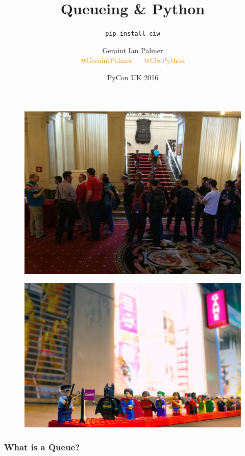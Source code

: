 \documentclass{beamer}
\title
{Queueing \& Python}
\subtitle{\texttt{pip install ciw}}
\author{Geraint Ian Palmer\\ \textcolor{darkorange}{@GeraintPalmer} $\quad$ \textcolor{darkorange}{@CiwPython}}
\date{PyCon UK 2016}
\begin{document}
\frame{\titlepage}


\begin{frame}
\begin{figure}
    \includegraphics[width=\textwidth]{pyconqueue}
\end{figure}
\end{frame}

\begin{frame}
\begin{figure}
    \includegraphics[width=\textwidth]{legoqueue}
\end{figure}
\end{frame}

\begin{frame}
\frametitle{What is a Queue?}
\begin{figure}
  
\end{figure}
\end{frame}
\end{document}
